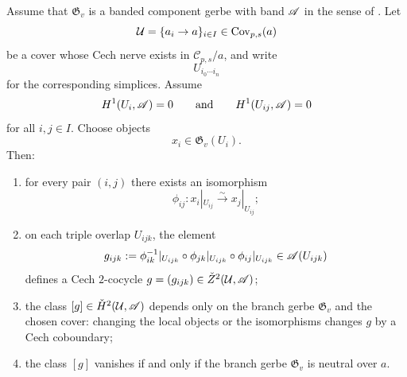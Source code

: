 \begin{theorem}\label{thm:cech-bridge-compatible-realizations}
Assume that $\mathfrak G_v$ is a banded component gerbe with band $\mathscr{A}$ in the sense of . Let
\[
\mathcal U=\{a_i\to a\}_{i\in I}\in \mathrm{Cov}_{p,s}(a)
\]
be a cover whose Cech nerve exists in $\mathcal C_{p,s}/a$, and write
\[
U_{i_0\cdots i_n}
\]
for the corresponding simplices. Assume
\[
H^1(U_i,\mathscr{A})=0
\qquad\text{and}\qquad
H^1(U_{ij},\mathscr{A})=0
\]
for all $i,j\in I$. Choose objects
\[
x_i\in \mathfrak G_v(U_i).
\]
Then:
\begin{enumerate}[label=(\roman*),nosep]
\item for every pair $(i,j)$ there exists an isomorphism
\[
\phi_{ij}:x_i|_{U_{ij}}\xrightarrow{\sim} x_j|_{U_{ij}};
\]
\item on each triple overlap $U_{ijk}$, the element
\[
g_{ijk}:=\phi_{ik}^{-1}|_{U_{ijk}}\circ \phi_{jk}|_{U_{ijk}}\circ \phi_{ij}|_{U_{ijk}}
\in \mathscr{A}(U_{ijk})
\]
defines a Cech $2$-cocycle $g=(g_{ijk})\in \check Z^2(\mathcal U,\mathscr{A})$;
\item the class $[g]\in \check{H}^2(\mathcal U,\mathscr{A})$ depends only on the branch gerbe $\mathfrak G_v$ and the chosen cover: changing the local objects or the isomorphisms changes $g$ by a Cech coboundary;
\item the class $[g]$ vanishes if and only if the branch gerbe $\mathfrak G_v$ is neutral over $a$.
\end{enumerate}
\end{theorem}

